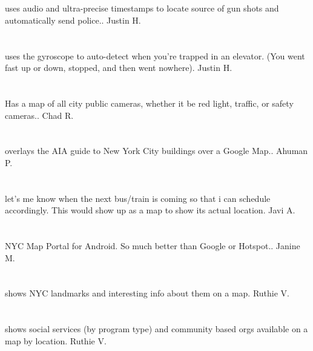 \section{}uses audio and ultra-precise timestamps to locate source of gun shots and automatically send police.. Justin H.
\section{}uses the gyroscope to auto-detect when you're trapped in an elevator. (You went fast up or down,  stopped,  and then went nowhere). Justin H.
\section{}Has a map of all city public cameras,  whether it be red light,  traffic,  or safety cameras.. Chad R.
\section{} overlays the AIA guide to New York City buildings over a Google Map.. Ahuman P.
\section{}let's me know when the next bus/train is  coming so that i can schedule accordingly. This would show up as a map to show its actual location. Javi A.
\section{}NYC Map Portal for Android. So much better than Google or Hotspot.. Janine M.
\section{}shows NYC landmarks and interesting info about them on a map. Ruthie V.
\section{}shows social services (by program type) and community based orgs available on a map by location. Ruthie V.
